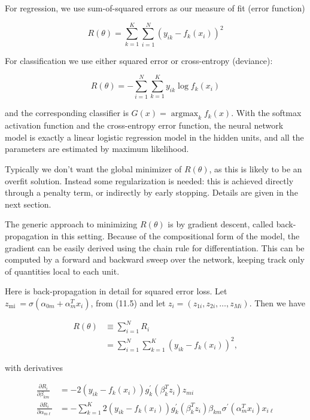 \documentclass[10pt]{article}
\begin{document}
For regression, we use sum-of-squared errors as our measure of fit (error function)


\begin{equation*}
R(\theta)=\sum_{k=1}^{K} \sum_{i=1}^{N}\left(y_{i k}-f_{k}\left(x_{i}\right)\right)^{2} \tag{11.9}
\end{equation*}


For classification we use either squared error or cross-entropy (deviance):


\begin{equation*}
R(\theta)=-\sum_{i=1}^{N} \sum_{k=1}^{K} y_{i k} \log f_{k}\left(x_{i}\right) \tag{11.10}
\end{equation*}


and the corresponding classifier is $G(x)=\operatorname{argmax}_{k} f_{k}(x)$. With the softmax activation function and the cross-entropy error function, the neural network model is exactly a linear logistic regression model in the hidden units, and all the parameters are estimated by maximum likelihood.

Typically we don't want the global minimizer of $R(\theta)$, as this is likely to be an overfit solution. Instead some regularization is needed: this is achieved directly through a penalty term, or indirectly by early stopping. Details are given in the next section.

The generic approach to minimizing $R(\theta)$ is by gradient descent, called back-propagation in this setting. Because of the compositional form of the model, the gradient can be easily derived using the chain rule for differentiation. This can be computed by a forward and backward sweep over the network, keeping track only of quantities local to each unit.

Here is back-propagation in detail for squared error loss. Let $z_{\text {mi }}= \sigma\left(\alpha_{0 m}+\alpha_{m}^{T} x_{i}\right)$, from (11.5) and let $z_{i}=\left(z_{1 i}, z_{2 i}, \ldots, z_{M i}\right)$. Then we have


\begin{align*}
R(\theta) & \equiv \sum_{i=1}^{N} R_{i} \\
& =\sum_{i=1}^{N} \sum_{k=1}^{K}\left(y_{i k}-f_{k}\left(x_{i}\right)\right)^{2}, \tag{11.11}
\end{align*}


with derivatives


\begin{align*}
\frac{\partial R_{i}}{\partial \beta_{k m}} & =-2\left(y_{i k}-f_{k}\left(x_{i}\right)\right) g_{k}^{\prime}\left(\beta_{k}^{T} z_{i}\right) z_{m i} \\
\frac{\partial R_{i}}{\partial \alpha_{m \ell}} & =-\sum_{k=1}^{K} 2\left(y_{i k}-f_{k}\left(x_{i}\right)\right) g_{k}^{\prime}\left(\beta_{k}^{T} z_{i}\right) \beta_{k m} \sigma^{\prime}\left(\alpha_{m}^{T} x_{i}\right) x_{i \ell} \tag{11.12}
\end{align*}
\end{document}
